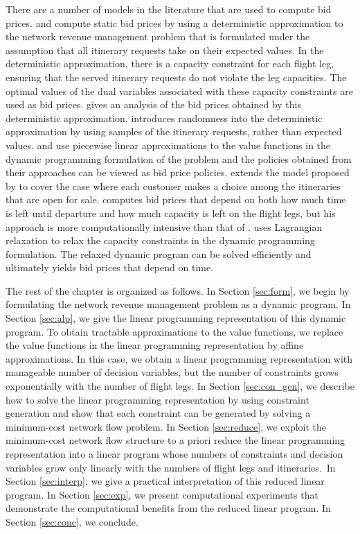 There are a number of models in the literature that are used to compute bid prices.  and  compute static bid prices by using a deterministic approximation to the network revenue management problem that is formulated under the assumption that all itinerary requests take on their expected values. In the deterministic approximation, there is a capacity constraint for each flight leg, ensuring that the served itinerary requests do not violate the leg capacities. The optimal values of the dual variables associated with these capacity constraints are used as bid prices.  gives an analysis of the bid prices obtained by this deterministic approximation.  introduces randomness into the deterministic approximation by using samples of the itinerary requests, rather than expected values.  and  use piecewise linear approximations to the value functions in the dynamic programming formulation of the problem and the policies obtained from their approaches can be viewed as bid price policies.  extends the model proposed by  to cover the case where each customer makes a choice among the itineraries that are open for sale.  computes bid prices that depend on both how much time is left until departure and how much capacity is left on the flight legs, but his approach is more computationally intensive than that of .  uses Lagrangian relaxation to relax the capacity constraints in the dynamic programming formulation. The relaxed dynamic program can be solved efficiently and ultimately yields bid prices that depend on time.

The rest of the chapter is organized as follows. In Section \ref{sec:form}, we begin by formulating the network revenue management problem as a dynamic program. In Section \ref{sec:alp}, we give the  linear programming representation of this dynamic program. To obtain tractable approximations to the value functions, we replace the value functions in the linear programming representation by affine approximations. In this case, we obtain a linear programming representation with manageable number of decision variables, but the number of constraints grows exponentially with the number of flight legs. In Section \ref{sec:con_gen}, we describe how to solve the linear programming representation by using constraint generation and show that each constraint can be generated by solving a minimum-cost network flow problem. In Section \ref{sec:reduce}, we exploit the minimum-cost network flow structure to a priori reduce the linear programming representation into a linear program whose numbers of constraints and decision variables grow only linearly with the numbers of flight legs and itineraries.~In Section \ref{sec:interp}, we give a practical interpretation of this reduced linear program. In Section \ref{sec:exp}, we present computational experiments that demonstrate the computational benefits from the reduced linear program. In Section \ref{sec:conc}, we conclude.

